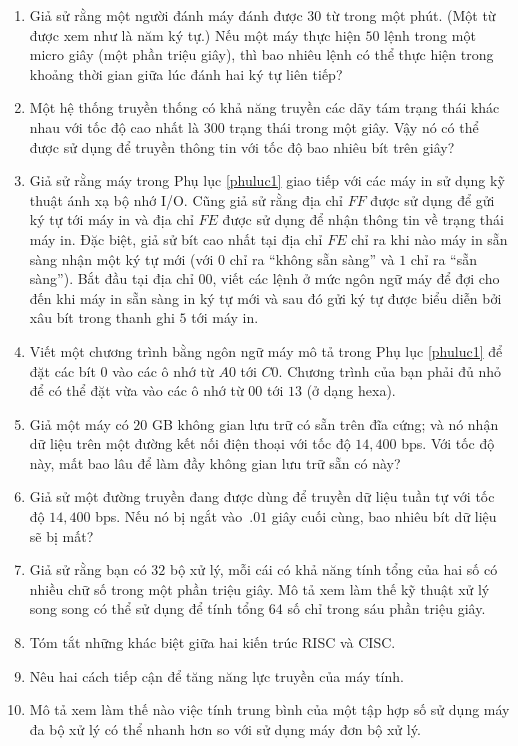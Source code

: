 \begin{multicols}{2}
\begin{enumerate}
  \item Giả sử rằng một người đánh máy đánh được $30$ từ trong một phút. (Một từ được xem
    như là năm ký tự.) Nếu một máy thực hiện $50$ lệnh trong một micro giây (một phần
    triệu giây), thì bao nhiêu lệnh có thể thực hiện trong khoảng thời gian giữa lúc đánh
    hai ký tự liên tiếp?

  \item Một hệ thống truyền thống có khả năng truyền các dãy tám trạng thái khác nhau với
    tốc độ cao nhất là $300$ trạng thái trong một giây. Vậy nó có thể được sử dụng để
    truyền thông tin với tốc độ bao nhiêu bít trên giây?


  \item Giả sử rằng máy trong Phụ lục \ref{phuluc1} giao tiếp với các máy in sử dụng kỹ
    thuật ánh xạ bộ nhớ I/O. Cũng giả sử rằng địa chỉ $FF$ được sử dụng để gửi ký tự tới
    máy in và địa chỉ $FE$ được sử dụng để nhận thông tin về trạng thái máy in. Đặc biệt,
    giả sử bít cao nhất tại địa chỉ $FE$ chỉ ra khi nào máy in sẵn sàng nhận một ký tự mới
    (với $0$ chỉ ra ``không sẵn sàng'' và $1$ chỉ ra ``sẵn sàng''). Bắt đầu tại địa chỉ
    $00$, viết các lệnh ở mức ngôn ngữ máy để đợi cho đến khi máy in sẵn sàng in ký tự mới
    và sau đó gửi ký tự được biểu diễn bởi xâu bít trong thanh ghi $5$ tới máy in.


  \item Viết một chương trình bằng ngôn ngữ máy mô tả trong Phụ lục \ref{phuluc1} để đặt
    các bít $0$ vào các ô nhớ từ $A0$ tới $C0$. Chương trình của bạn phải đủ nhỏ để có thể
    đặt vừa vào các ô nhớ từ $00$ tới $13$ (ở dạng hexa).


  \item Giả một máy có $20$ GB không gian lưu trữ có sẵn trên đĩa cứng; và nó nhận dữ liệu
    trên một đường kết nối điện thoại với tốc độ $14,400$ bps. Với tốc độ này, mất bao lâu
    để làm đầy không gian lưu trữ sẵn có này?


  \item Giả sử một đường truyền đang được dùng để truyền dữ liệu tuần tự với tốc độ
    $14,400$ bps. Nếu nó bị ngắt vào~$.01$ giây cuối cùng, bao nhiêu bít dữ liệu sẽ bị
    mất?

  \item Giả sử rằng bạn có $32$ bộ xử lý, mỗi cái có khả năng tính tổng của hai số có
    nhiều chữ số trong một phần triệu giây. Mô tả xem làm thế kỹ thuật xử lý song song có
    thể sử dụng để tính tổng $64$ số chỉ trong sáu phần triệu giây.

  \item Tóm tắt những khác biệt giữa hai kiến trúc RISC và CISC.

  \item Nêu hai cách tiếp cận để tăng năng lực truyền của máy tính.

  \item Mô tả xem làm thế nào việc tính trung bình của một tập hợp số sử dụng máy đa bộ xử
    lý có thể nhanh hơn so với sử dụng máy đơn bộ xử lý.

  \end{enumerate}

\end{multicols}


